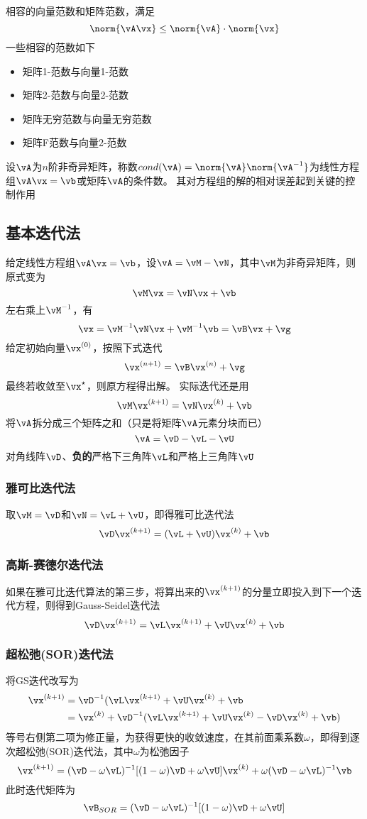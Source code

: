 相容的向量范数和矩阵范数，满足
\[\norm{\vA\vx}\leq\norm{\vA}\cdot\norm{\vx}\]
一些相容的范数如下
\begin{itemize}
    \item 矩阵1-范数与向量1-范数
    \item 矩阵2-范数与向量2-范数
    \item 矩阵无穷范数与向量无穷范数
    \item 矩阵F范数与向量2-范数
\end{itemize}
\begin{definition}[条件数]
    设$\vA$为$n$阶非奇异矩阵，称数$\mathop{cond}(\vA)=\norm{\vA}\norm{\vA^{-1}}$为线性方程组$\vA\vx=\vb$或矩阵$\vA$的条件数。
    其对方程组的解的相对误差起到关键的控制作用
\end{definition}

\subsection{基本迭代法}
给定线性方程组$\vA\vx=\vb$，设$\vA=\vM-\vN$，其中$\vM$为非奇异矩阵，则原式变为
\[\vM\vx=\vN\vx+\vb\]
左右乘上$\vM^{-1}$，有
\[\vx=\vM^{-1}\vN\vx+\vM^{-1}\vb=\vB\vx+\vg\]
给定初始向量$\vx^{(0)}$，按照下式迭代
\[\vx^{(n+1)}=\vB\vx^{(n)}+\vg\]
最终若收敛至$\vx^\star$，则原方程得出解。
实际迭代还是用
\[\vM\vx^{(k+1)}=\vN\vx^{(k)}+\vb\]
将$\vA$拆分成三个矩阵之和（只是将矩阵$\vA$元素分块而已）
\[\vA=\vD-\vL-\vU\]
对角线阵$\vD$、\textbf{负的}严格下三角阵$\vL$和严格上三角阵$\vU$

\subsubsection{雅可比迭代法}
取$\vM=\vD$和$\vN=\vL+\vU$，即得雅可比迭代法
\[\vD\vx^{(k+1)}=(\vL+\vU)\vx^{(k)}+\vb\]

\subsubsection{高斯-赛德尔迭代法}
如果在雅可比迭代算法的第三步，将算出来的$\vx^{(k+1)}$的分量立即投入到下一个迭代方程，则得到Gauss-Seidel迭代法
\[\vD\vx^{(k+1)}=\vL\vx^{(k+1)}+\vU\vx^{(k)}+\vb\]

\subsubsection{超松弛(SOR)迭代法}
将GS迭代改写为
\[\begin{aligned}
    \vx^{(k+1)}&=\vD^{-1}(\vL\vx^{(k+1)}+\vU\vx^{(k)}+\vb\\
    &=\vx^{(k)}+\vD^{-1}(\vL\vx^{(k+1)}+\vU\vx^{(k)}-\vD\vx^{(k)}+\vb)
\end{aligned}\]
等号右侧第二项为修正量，为获得更快的收敛速度，在其前面乘系数$\omega$，即得到逐次超松弛(SOR)迭代法，其中$\omega$为松弛因子
\[\vx^{(k+1)}=(\vD-\omega\vL)^{-1}[(1-\omega)\vD+\omega\vU]\vx^{(k)}+\omega(\vD-\omega\vL)^{-1}\vb\]
此时迭代矩阵为
\[\vB_{SOR}=(\vD-\omega\vL)^{-1}[(1-\omega)\vD+\omega\vU]\]